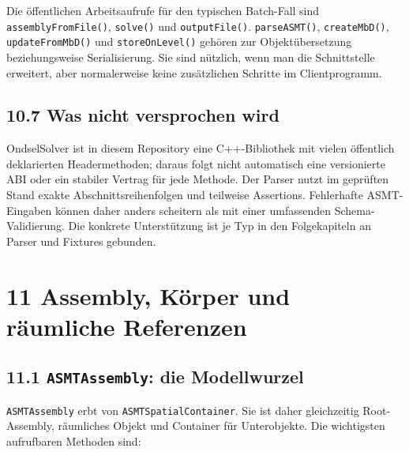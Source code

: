 \documentclass[
  12pt
]{book}
\begin{document}
Die öffentlichen Arbeitsaufrufe für den typischen Batch-Fall sind
\texttt{assemblyFromFile()}, \texttt{solve()} und \texttt{outputFile()}.
\texttt{parseASMT()}, \texttt{createMbD()}, \texttt{updateFromMbD()} und
\texttt{storeOnLevel()} gehören zur Objektübersetzung beziehungsweise
Serialisierung. Sie sind nützlich, wenn man die Schnittstelle erweitert,
aber normalerweise keine zusätzlichen Schritte im Clientprogramm.

\hypertarget{was-nicht-versprochen-wird}{%
\section{\texorpdfstring{{10.7} Was nicht versprochen
wird}{10.7 Was nicht versprochen wird}}\label{was-nicht-versprochen-wird}}

OndselSolver ist in diesem Repository eine C++-Bibliothek mit vielen
öffentlich deklarierten Headermethoden; daraus folgt nicht automatisch
eine versionierte ABI oder ein stabiler Vertrag für jede Methode. Der
Parser nutzt im geprüften Stand exakte Abschnittsreihenfolgen und
teilweise Assertions. Fehlerhafte ASMT-Eingaben können daher anders
scheitern als mit einer umfassenden Schema-Validierung. Die konkrete
Unterstützung ist je Typ in den Folgekapiteln an Parser und Fixtures
gebunden.

\hypertarget{kap-assembly-koerper}{%
\chapter{\texorpdfstring{{11} Assembly, Körper und räumliche
Referenzen}{11 Assembly, Körper und räumliche Referenzen}}\label{kap-assembly-koerper}}

\hypertarget{asmtassembly-die-modellwurzel}{%
\section{\texorpdfstring{{11.1} \texttt{ASMTAssembly}: die
Modellwurzel}{11.1 ASMTAssembly: die Modellwurzel}}\label{asmtassembly-die-modellwurzel}}

\texttt{ASMTAssembly} erbt von \texttt{ASMTSpatialContainer}. Sie ist
daher gleichzeitig Root-Assembly, räumliches Objekt und Container für
Unterobjekte. Die wichtigsten aufrufbaren Methoden sind:
\end{document}
